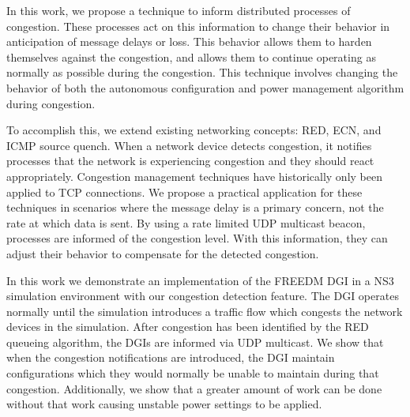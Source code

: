 In this work, we propose a technique to inform distributed processes of congestion.
These processes act on this information to change their behavior in anticipation of message delays or loss.
This behavior allows them to harden themselves against the congestion, and allows them to continue operating as normally as possible during the congestion.
This technique involves changing the behavior of both the autonomous configuration and power management algorithm during congestion.

To accomplish this, we extend existing networking concepts: \ac{RED}, \ac{ECN}, and ICMP source quench.
When a network device detects congestion, it notifies processes that the network is experiencing congestion and they should react appropriately.
Congestion management techniques have historically only been applied to TCP connections.
We propose a practical application for these techniques in scenarios where the message delay is a primary concern, not the rate at which data is sent.
By using a rate limited UDP multicast beacon, processes are informed of the congestion level.
With this information, they can adjust their behavior to compensate for the detected congestion.

In this work we demonstrate an implementation of the \ac{FREEDM} \ac{DGI} in a \ac{NS3} simulation environment with our congestion detection feature.
The \ac{DGI} operates normally until the simulation introduces a traffic flow which congests the network devices in the simulation.
After congestion has been identified by the \ac{RED} queueing algorithm, the \ac{DGI}s are informed via UDP multicast.
We show that when the congestion notifications are introduced, the \ac{DGI} maintain configurations which they would normally be unable to maintain during that congestion.
Additionally, we show that a greater amount of work can be done without that work causing unstable power settings to be applied.
